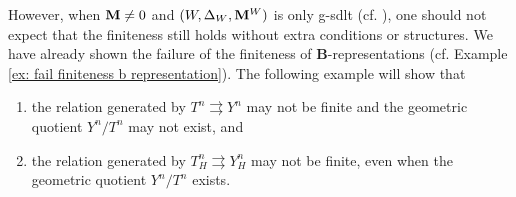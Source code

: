 \documentclass[11pt]{amsart}
\numberwithin{equation}{section}
\newcommand{\Mm}{{\bf{M}}}
\theoremstyle{definition}
\theoremstyle{definition}
\theoremstyle{definition}
\begin{document}
However, when $\Mm\neq0$ and $(W,\Delta_W,\Mm^W)$ is only g-sdlt (cf.
\cite{Hu21}), one should not expect that the finiteness still holds
without extra conditions or structures. We have already shown the
failure of the finiteness of \textbf{B}-representations (cf. Example
\ref{ex: fail finiteness b representation}). The following example
will show that
\begin{enumerate}
  \item the relation generated by $T^n\rightrightarrows Y^n$ may not
    be finite and the geometric quotient $Y^n/T^n$ may not exist, and
  \item the relation generated by $T^n_H\rightrightarrows Y^n_H$ may
    not be finite, even when the geometric quotient $Y^n/T^n$ exists.
\end{enumerate}
\end{document}

